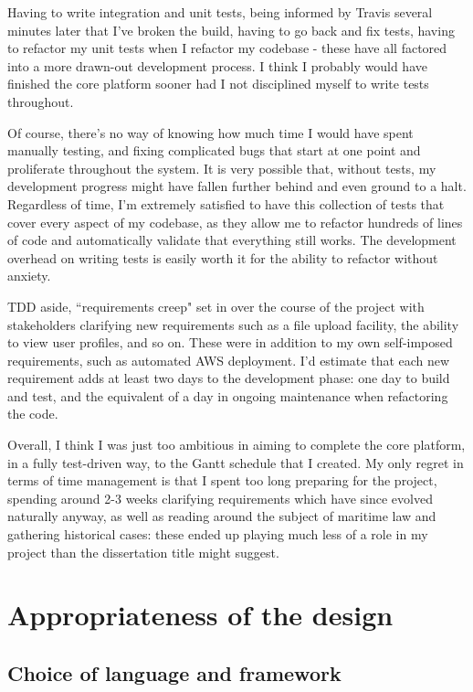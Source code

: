 Having to write integration and unit tests, being informed by Travis several minutes later that I've broken the build, having to go back and fix tests, having to refactor my unit tests when I refactor my codebase - these have all factored into a more drawn-out development process. I think I probably would have finished the core platform sooner had I not disciplined myself to write tests throughout.

Of course, there's no way of knowing how much time I would have spent manually testing, and fixing complicated bugs that start at one point and proliferate throughout the system. It is very possible that, without tests, my development progress might have fallen further behind and even ground to a halt. Regardless of time, I'm extremely satisfied to have this collection of tests that cover every aspect of my codebase, as they allow me to refactor hundreds of lines of code and automatically validate that everything still works. The development overhead on writing tests is easily worth it for the ability to refactor without anxiety.

TDD aside, ``requirements creep" set in over the course of the project with stakeholders clarifying new requirements such as a file upload facility, the ability to view user profiles, and so on. These were in addition to my own self-imposed requirements, such as automated AWS deployment. I'd estimate that each new requirement adds at least two days to the development phase: one day to build and test, and the equivalent of a day in ongoing maintenance when refactoring the code.

Overall, I think I was just too ambitious in aiming to complete the core platform, in a fully test-driven way, to the Gantt schedule that I created. My only regret in terms of time management is that I spent too long preparing for the project, spending around 2-3 weeks clarifying requirements which have since evolved naturally anyway, as well as reading around the subject of maritime law and gathering historical cases: these ended up playing much less of a role in my project than the dissertation title might suggest.

\section{Appropriateness of the design}

\subsection{Choice of language and framework}

